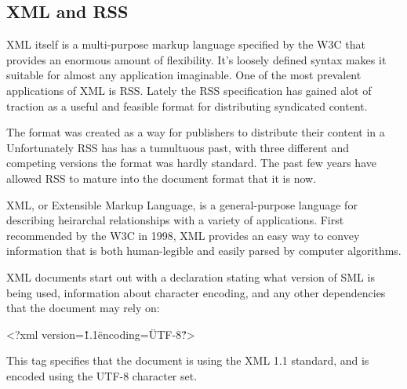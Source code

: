\documentclass[a4paper,12pt]{report}
\begin{document}
\begin{description}
\section{XML and RSS}
XML itself is a multi-purpose markup language specified by the W3C that provides an enormous amount of flexibility.
It's loosely defined syntax makes it suitable for almost any application imaginable.
One of the most prevalent applications of XML is RSS.
Lately the RSS specification has gained alot of traction as a useful and feasible format for distributing syndicated content.


The format was created as a way for publishers to distribute their content in a 
Unfortunately RSS has has a tumultuous past, with three different and competing versions the format was hardly standard.
The past few years have allowed RSS to mature into the document format that it is now.




XML, or Extensible Markup Language, is a general-purpose language for describing heirarchal relationships with a variety of applications. 
First recommended by the W3C in 1998, XML provides an easy way to convey information that is both human-legible and easily parsed by computer algorithms. 


XML documents start out with a declaration stating what version of SML is being used, information about character encoding, and any other dependencies that the document may rely on:


<?xml version=\"1.1\" encoding=\"UTF-8\"?>


This tag specifies that the document is using the XML 1.1 standard, and is encoded using the UTF-8 character set.



\end{description}
\end{document}
